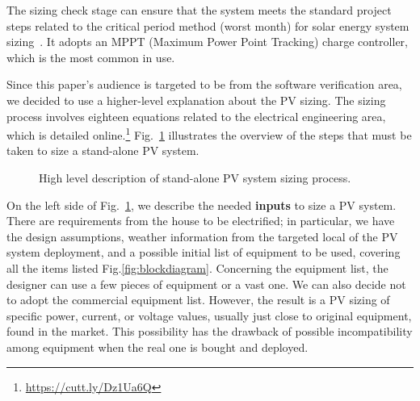 \documentclass[10pt,journal,compsoc]{IEEEtran}
\begin{document}
The sizing check stage can ensure that the system meets the standard project steps related to the critical period method (worst month) for solar energy system sizing~\cite{Pinho}. It adopts an MPPT (Maximum Power Point Tracking) charge controller, which is the most common in use. 

Since this paper's audience is targeted to be from the software verification area, we decided to use a higher-level explanation about the PV sizing. The sizing process involves eighteen equations related to the electrical engineering area, which is detailed online.\footnote{\href{https://cutt.ly/Dz1Ua6Q}{https://cutt.ly/Dz1Ua6Q}} Fig.~\ref{fig:flow} illustrates the overview of the steps that must be taken to size a stand-alone PV system.
%
\begin{figure}[h]
\centering
\caption{High level description of stand-alone PV system sizing process.}
\label{fig:flow} 
\end{figure}

On the left side of Fig.~\ref{fig:flow}, we describe the needed \textbf{inputs} to size a PV system. There are requirements from the house to be electrified; in particular, we have the design assumptions, weather information from the targeted local of the PV system deployment, and a possible initial list of equipment to be used, covering all the items listed Fig.\ref{fig:blockdiagram}. Concerning the equipment list, the designer can use a few pieces of equipment or a vast one. We can also decide not to adopt the commercial equipment list. However, the result is a PV sizing of specific power, current, or voltage values, usually just close to original equipment, found in the market. This possibility has the drawback of possible incompatibility among equipment when the real one is bought and deployed.
\end{document}
